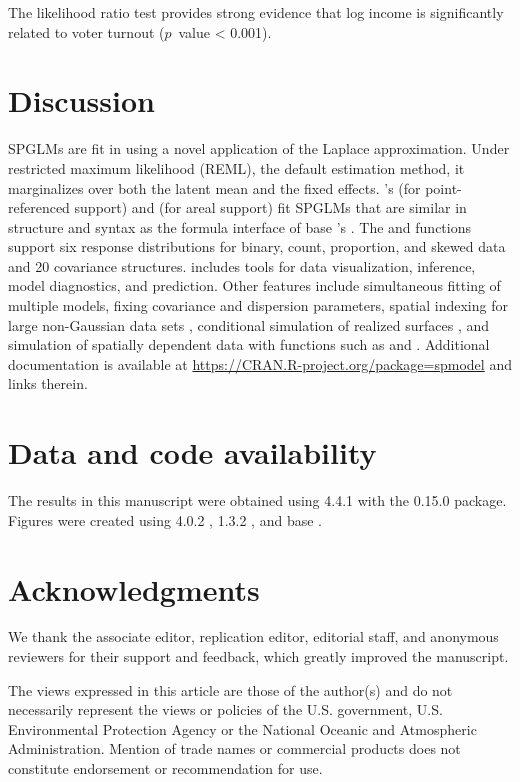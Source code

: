 \documentclass[
]{jss}
\begin{document}
The likelihood ratio test provides strong evidence that log income is
significantly related to voter turnout (\(p\)~value \textless{} 0.001).

\section{Discussion}\label{sec-discussion}

SPGLMs are fit in  using a novel application of the Laplace
approximation. Under restricted maximum likelihood (REML), the default
estimation method, it marginalizes over both the latent mean and the
fixed effects. 's  (for point-referenced
support) and  (for areal support) fit SPGLMs that are
similar in structure and syntax as the formula interface of base
's . The  and 
functions support six response distributions for binary, count,
proportion, and skewed data and 20 covariance structures. 
includes tools for data visualization, inference, model diagnostics, and
prediction. Other features include simultaneous fitting of multiple
models, fixing covariance and dispersion parameters, spatial indexing
for large non-Gaussian data sets \citep{ver2023indexing}, conditional
simulation of realized surfaces \citep{zimmerman2024spatial}, and
simulation of spatially dependent data with functions such as
 and . Additional documentation is
available at \url{https://CRAN.R-project.org/package=spmodel} and links
therein.

\section*{Data and code availability}\label{data-and-code-availability}

The results in this manuscript were obtained using  4.4.1
with the  0.15.0 package. Figures were created using
 4.0.2 \citep{wickham2016ggplot2},  1.3.2
\citep{pedersen2025patchwork}, and base .

\section*{Acknowledgments}\label{acknowledgments}

We thank the associate editor, replication editor, editorial staff, and
anonymous reviewers for their support and feedback, which greatly
improved the manuscript.

The views expressed in this article are those of the author(s) and do
not necessarily represent the views or policies of the U.S. government,
U.S. Environmental Protection Agency or the National Oceanic and
Atmospheric Administration. Mention of trade names or commercial
products does not constitute endorsement or recommendation for use.


\end{document}
